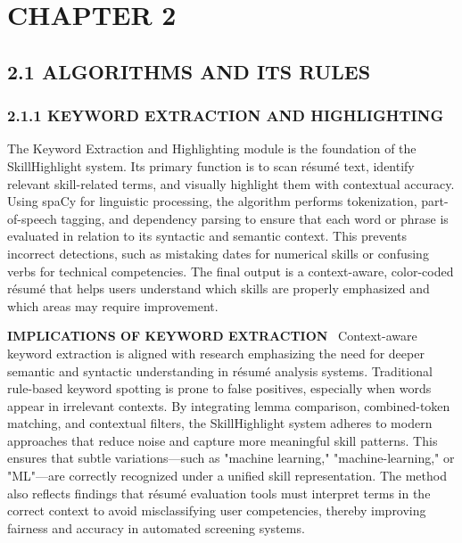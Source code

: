\documentclass[12pt]{article}
\renewcommand{\paragraph}[1]{\noindent\textbf{\MakeUppercase{#1}}\ }
\begin{document}
\section*{CHAPTER 2}

\subsection*{2.1 ALGORITHMS AND ITS RULES}

\subsubsection*{2.1.1 KEYWORD EXTRACTION AND HIGHLIGHTING}
The Keyword Extraction and Highlighting module is the foundation of the SkillHighlight system. Its primary function is to scan résumé text, identify relevant skill-related terms, and visually highlight them with contextual accuracy. Using spaCy for linguistic processing, the algorithm performs tokenization, part-of-speech tagging, and dependency parsing to ensure that each word or phrase is evaluated in relation to its syntactic and semantic context. This prevents incorrect detections, such as mistaking dates for numerical skills or confusing verbs for technical competencies. The final output is a context-aware, color-coded résumé that helps users understand which skills are properly emphasized and which areas may require improvement.

\paragraph{IMPLICATIONS OF KEYWORD EXTRACTION}
Context-aware keyword extraction is aligned with research emphasizing the need for deeper semantic and syntactic understanding in résumé analysis systems. Traditional rule-based keyword spotting is prone to false positives, especially when words appear in irrelevant contexts. By integrating lemma comparison, combined-token matching, and contextual filters, the SkillHighlight system adheres to modern approaches that reduce noise and capture more meaningful skill patterns. This ensures that subtle variations—such as "machine learning," "machine-learning," or "ML"—are correctly recognized under a unified skill representation. The method also reflects findings that résumé evaluation tools must interpret terms in the correct context to avoid misclassifying user competencies, thereby improving fairness and accuracy in automated screening systems.
\end{document}
